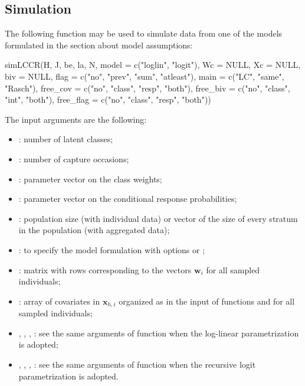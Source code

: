 \subsection{Simulation}
%
The following function may be used to simulate data from one of the models formulated in the section about model assumptions:
%
\begin{example*}
simLCCR(H, J, be, la, N, model = c("loglin", "logit"), Wc = NULL, Xc = NULL, biv = NULL,
        flag = c("no", "prev", "sum", "atleast"),
        main = c("LC", "same", "Rasch"),
        free_cov = c("no", "class", "resp", "both"),
        free_biv = c("no", "class", "int", "both"),
        free_flag = c("no", "class", "resp", "both"))
\end{example*}
%
The input arguments are the following:
%
\begin{itemize}
%
\item {}: number of latent classes;
%
\item {}: number of capture occasions;
%
\item {}: parameter vector on the class weights;
%
\item {}: parameter vector on the conditional response probabilities;
%
\item {}: population size (with individual data) or vector of the size of every stratum in the population (with aggregated data);
%
\item {}: to specify the model formulation with options  or ;
%
\item {}: matrix with rows corresponding to the vectors $\bm{w}_i$ for all sampled individuals;
%
\item {}: array of covariates in $\bm{x}_{h,i}$ organized as in the input of functions  and  for all sampled individuals;
%
\item {}, , , : see the same arguments of function  when the log-linear parametrization is adopted;
%
\item {}, , , : see the same arguments of function  when the recursive logit parametrization is adopted.
%
\end{itemize}
%
